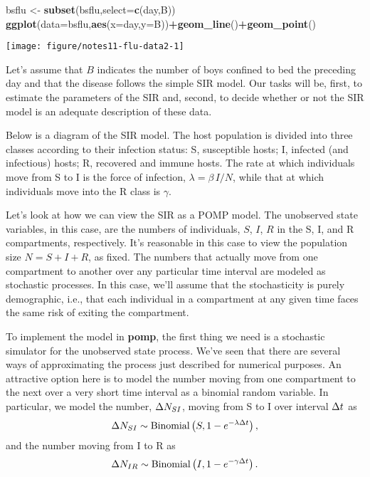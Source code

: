 \documentclass[]{article}
\newenvironment{Shaded}{\begin{snugshade}}{\end{snugshade}}
\newcommand{\KeywordTok}[1]{\textcolor[rgb]{0.13,0.29,0.53}{\textbf{#1}}}
\newcommand{\DataTypeTok}[1]{\textcolor[rgb]{0.13,0.29,0.53}{#1}}
\newcommand{\StringTok}[1]{\textcolor[rgb]{0.31,0.60,0.02}{#1}}
\newcommand{\OperatorTok}[1]{\textcolor[rgb]{0.81,0.36,0.00}{\textbf{#1}}}
\newcommand{\NormalTok}[1]{#1}
\begin{document}
\begin{Shaded}
\begin{Highlighting}[]
\NormalTok{bsflu <-}\StringTok{ }\KeywordTok{subset}\NormalTok{(bsflu,}\DataTypeTok{select=}\KeywordTok{c}\NormalTok{(day,B))}
\KeywordTok{ggplot}\NormalTok{(}\DataTypeTok{data=}\NormalTok{bsflu,}\KeywordTok{aes}\NormalTok{(}\DataTypeTok{x=}\NormalTok{day,}\DataTypeTok{y=}\NormalTok{B))}\OperatorTok{+}\KeywordTok{geom_line}\NormalTok{()}\OperatorTok{+}\KeywordTok{geom_point}\NormalTok{()}
\end{Highlighting}
\end{Shaded}

\begin{center}\texttt{[image: figure/notes11-flu-data2-1]} \end{center}

Let's assume that \(B\) indicates the number of boys confined to bed the
preceding day and that the disease follows the simple SIR model. Our
tasks will be, first, to estimate the parameters of the SIR and, second,
to decide whether or not the SIR model is an adequate description of
these data.

Below is a diagram of the SIR model. The host population is divided into
three classes according to their infection status: S, susceptible hosts;
I, infected (and infectious) hosts; R, recovered and immune hosts. The
rate at which individuals move from S to I is the force of infection,
\(\lambda=\beta\,I/N\), while that at which individuals move into the R
class is \(\gamma\).

\hypertarget{htmlwidget-91698f29ac8403830b98}{}

Let's look at how we can view the SIR as a POMP model. The unobserved
state variables, in this case, are the numbers of individuals, \(S\),
\(I\), \(R\) in the S, I, and R compartments, respectively. It's
reasonable in this case to view the population size \(N=S+I+R\), as
fixed. The numbers that actually move from one compartment to another
over any particular time interval are modeled as stochastic processes.
In this case, we'll assume that the stochasticity is purely demographic,
i.e., that each individual in a compartment at any given time faces the
same risk of exiting the compartment.

To implement the model in \textbf{pomp}, the first thing we need is a
stochastic simulator for the unobserved state process. We've seen that
there are several ways of approximating the process just described for
numerical purposes. An attractive option here is to model the number
moving from one compartment to the next over a very short time interval
as a binomial random variable. In particular, we model the number,
\(\Delta{N_{SI}}\), moving from S to I over interval \(\Delta{t}\) as
\[\Delta{N_{SI}} \sim \mathrm{Binomial}\left(S,1-e^{-\lambda\Delta{t}}\right),\] and
the number moving from I to R as
\[\Delta{N_{IR}} \sim \mathrm{Binomial}\left(I,1-e^{-\gamma\Delta{t}}\right).\]
\end{document}
